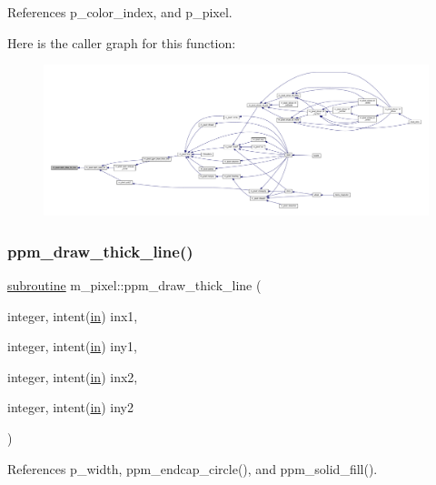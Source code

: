 References p\+\_\+color\+\_\+index, and p\+\_\+pixel.

Here is the caller graph for this function\+:
\nopagebreak
\begin{figure}[H]
\begin{center}
\leavevmode
\includegraphics[width=350pt]{namespacem__pixel_a6f75bc951acd07267e0841ca5985d8b7_icgraph}
\end{center}
\end{figure}
\mbox{\label{namespacem__pixel_a1629b7134d0ea4b0f301ca23df764b8e}} 
\subsubsection{\texorpdfstring{ppm\+\_\+draw\+\_\+thick\+\_\+line()}{ppm\_draw\_thick\_line()}}
{\footnotesize\ttfamily \hyperlink{M__stopwatch_83_8txt_acfbcff50169d691ff02d4a123ed70482}{subroutine} m\+\_\+pixel\+::ppm\+\_\+draw\+\_\+thick\+\_\+line (\begin{DoxyParamCaption}\item[{integer, intent(\hyperlink{M__journal_83_8txt_afce72651d1eed785a2132bee863b2f38}{in})}]{inx1,  }\item[{integer, intent(\hyperlink{M__journal_83_8txt_afce72651d1eed785a2132bee863b2f38}{in})}]{iny1,  }\item[{integer, intent(\hyperlink{M__journal_83_8txt_afce72651d1eed785a2132bee863b2f38}{in})}]{inx2,  }\item[{integer, intent(\hyperlink{M__journal_83_8txt_afce72651d1eed785a2132bee863b2f38}{in})}]{iny2 }\end{DoxyParamCaption})\hspace{0.3cm}{\ttfamily [private]}}



References p\+\_\+width, ppm\+\_\+endcap\+\_\+circle(), and ppm\+\_\+solid\+\_\+fill().


